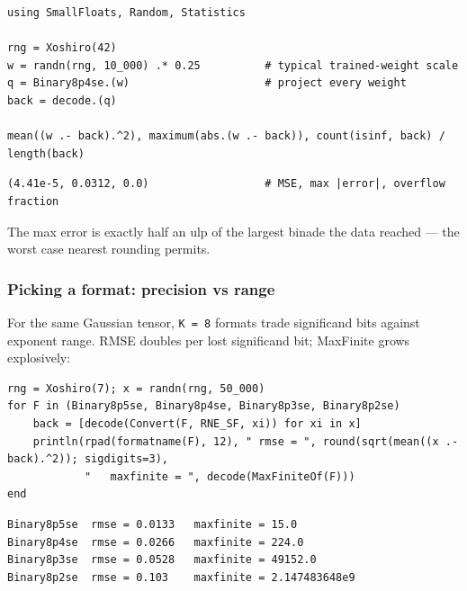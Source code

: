 \label{12845276900436285715}{}



\begin{minipage}{\linewidth}
\begin{verbatim}
using SmallFloats, Random, Statistics

rng = Xoshiro(42)
w = randn(rng, 10_000) .* 0.25          # typical trained-weight scale
q = Binary8p4se.(w)                     # project every weight
back = decode.(q)

mean((w .- back).^2), maximum(abs.(w .- back)), count(isinf, back) / length(back)
\end{verbatim}




\begin{verbatim}
(4.41e-5, 0.0312, 0.0)                  # MSE, max |error|, overflow fraction
\end{verbatim}
\end{minipage}




The max error is exactly half an ulp of the largest binade the data reached — the worst case nearest rounding permits.



\subsubsection{Picking a format: precision vs range}



\label{9815972904090952286}{}


For the same Gaussian tensor, \texttt{K = 8} formats trade significand bits against exponent range. RMSE doubles per lost significand bit; MaxFinite grows explosively:




\nopagebreak[4]
\begin{minipage}{\linewidth}
\begin{verbatim}
rng = Xoshiro(7); x = randn(rng, 50_000)
for F in (Binary8p5se, Binary8p4se, Binary8p3se, Binary8p2se)
    back = [decode(Convert(F, RNE_SF, xi)) for xi in x]
    println(rpad(formatname(F), 12), " rmse = ", round(sqrt(mean((x .- back).^2)); sigdigits=3),
            "   maxfinite = ", decode(MaxFiniteOf(F)))
end
\end{verbatim}




\begin{verbatim}
Binary8p5se  rmse = 0.0133   maxfinite = 15.0
Binary8p4se  rmse = 0.0266   maxfinite = 224.0
Binary8p3se  rmse = 0.0528   maxfinite = 49152.0
Binary8p2se  rmse = 0.103    maxfinite = 2.147483648e9
\end{verbatim}
\end{minipage}




